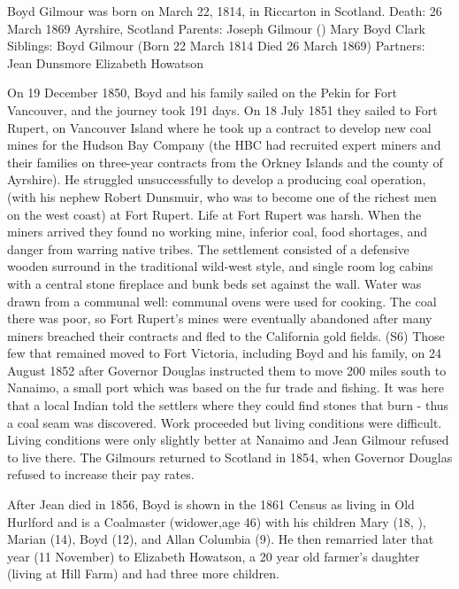 
Boyd Gilmour was born on March 22, 1814, in Riccarton in Scotland.
Death: 	26 March 1869 Ayrshire, Scotland
Parents: 	Joseph Gilmour ()
Mary Boyd Clark
Siblings: 	Boyd Gilmour (Born 22 March 1814
Died 26 March 1869)
Partners: 	Jean Dunsmore
Elizabeth Howatson

On 19 December 1850, Boyd and his family sailed on the Pekin for Fort Vancouver, and the journey took 191 days. On 18 July 1851 they sailed to Fort Rupert, on Vancouver Island where he took up a contract to develop new coal mines for the Hudson Bay Company (the HBC had recruited expert miners and their families on three-year contracts from the Orkney Islands and the county of Ayrshire). He struggled unsuccessfully to develop a producing coal operation, (with his nephew Robert Dunsmuir, who was to become one of the richest men on the west coast) at Fort Rupert. Life at Fort Rupert was harsh. When the miners arrived they found no working mine, inferior coal, food shortages, and danger from warring native tribes. The settlement consisted of a defensive wooden surround in the traditional wild-west style, and single room log cabins with a central stone fireplace and bunk beds set against the wall. Water was drawn from a communal well: communal ovens were used for cooking. The coal there was poor, so Fort Rupert’s mines were eventually abandoned after many miners breached their contracts and fled to the California gold fields. (S6) Those few that remained moved to Fort Victoria, including Boyd and his family, on 24 August 1852 after Governor Douglas instructed them to move 200 miles south to Nanaimo, a small port which was based on the fur trade and fishing. It was here that a local Indian told the settlers where they could find stones that burn - thus a coal seam was discovered. Work proceeded but living conditions were difficult. Living conditions were only slightly better at Nanaimo and Jean Gilmour refused to live there. The Gilmours returned to Scotland in 1854, when Governor Douglas refused to increase their pay rates.

After Jean died in 1856, Boyd is shown in the 1861 Census as living in Old Hurlford and is a Coalmaster (widower,age 46) with his children Mary (18, ), Marian (14), Boyd (12), and Allan Columbia (9). He then remarried later that year (11 November) to Elizabeth Howatson, a 20 year old farmer's daughter (living at Hill Farm) and had three more children.

